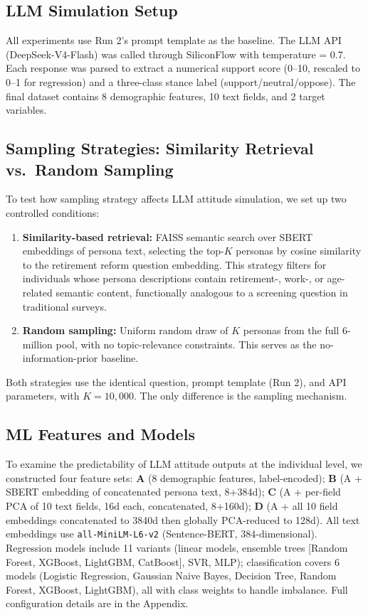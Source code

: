 \documentclass[11pt,a4paper]{article}
\begin{document}
\subsection{LLM Simulation Setup}

All experiments use Run 2's prompt template as the baseline. The LLM API (DeepSeek-V4-Flash) was called through SiliconFlow with temperature = 0.7. Each response was parsed to extract a numerical support score (0--10, rescaled to 0--1 for regression) and a three-class stance label (support/neutral/oppose). The final dataset contains 8 demographic features, 10 text fields, and 2 target variables.

\subsection{Sampling Strategies: Similarity Retrieval vs.\ Random Sampling}

To test how sampling strategy affects LLM attitude simulation, we set up two controlled conditions:

\begin{enumerate}[leftmargin=*]
    \item \textbf{Similarity-based retrieval:} FAISS semantic search over SBERT embeddings of persona text, selecting the top-$K$ personas by cosine similarity to the retirement reform question embedding. This strategy filters for individuals whose persona descriptions contain retirement-, work-, or age-related semantic content, functionally analogous to a screening question in traditional surveys.
    \item \textbf{Random sampling:} Uniform random draw of $K$ personas from the full 6-million pool, with no topic-relevance constraints. This serves as the no-information-prior baseline.
\end{enumerate}

Both strategies use the identical question, prompt template (Run 2), and API parameters, with $K = 10{,}000$. The only difference is the sampling mechanism.

\subsection{ML Features and Models}

To examine the predictability of LLM attitude outputs at the individual level, we constructed four feature sets: \textbf{A} (8 demographic features, label-encoded); \textbf{B} (A + SBERT embedding of concatenated persona text, 8+384d); \textbf{C} (A + per-field PCA of 10 text fields, 16d each, concatenated, 8+160d); \textbf{D} (A + all 10 field embeddings concatenated to 3840d then globally PCA-reduced to 128d). All text embeddings use \texttt{all-MiniLM-L6-v2} (Sentence-BERT, 384-dimensional). Regression models include 11 variants (linear models, ensemble trees [Random Forest, XGBoost, LightGBM, CatBoost], SVR, MLP); classification covers 6 models (Logistic Regression, Gaussian Naive Bayes, Decision Tree, Random Forest, XGBoost, LightGBM), all with class weights to handle imbalance. Full configuration details are in the Appendix.
\end{document}
